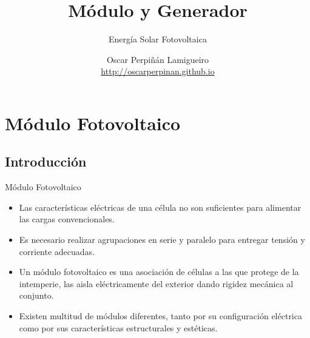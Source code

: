 \documentclass[xcolor={usenames,svgnames,dvipsnames}]{beamer}
\author{Oscar Perpiñán Lamigueiro \\ \url{http://oscarperpinan.github.io}}
\date{}
\title{Módulo y Generador}
\subtitle{Energía Solar Fotovoltaica}
\begin{document}
\maketitle

\section{Módulo Fotovoltaico}
\label{sec:org9c8a6de}

\subsection{Introducción}
\label{sec:orgd1d6720}

\begin{frame}[label={sec:orgbf654af}]{Módulo Fotovoltaico}
\begin{itemize}[<+->]
\item Las características eléctricas de una célula no son suficientes para alimentar las cargas convencionales.

\item Es necesario realizar \alert{agrupaciones en serie y paralelo para entregar tensión y corriente adecuadas}.

\item Un \alert{módulo fotovoltaico} es una \alert{asociación de células} a las que \alert{protege de la intemperie}, las \alert{aisla eléctricamente} del exterior dando \alert{rigidez mecánica} al conjunto.

\item Existen multitud de módulos diferentes, tanto por su configuración eléctrica como por sus características estructurales y estéticas.
\end{itemize}
\end{frame}
\end{document}
